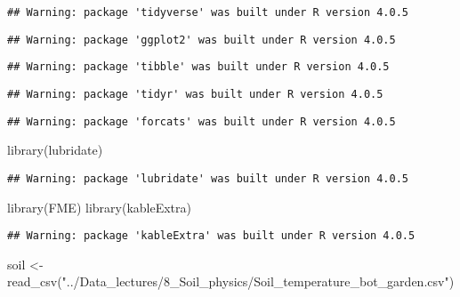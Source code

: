 \documentclass[
]{article}
\newenvironment{Shaded}{\begin{snugshade}}{\end{snugshade}}
\newcommand{\FunctionTok}[1]{\textcolor[rgb]{0.00,0.00,0.00}{#1}}
\newcommand{\NormalTok}[1]{#1}
\newcommand{\OtherTok}[1]{\textcolor[rgb]{0.56,0.35,0.01}{#1}}
\newcommand{\StringTok}[1]{\textcolor[rgb]{0.31,0.60,0.02}{#1}}
\begin{document}
\begin{verbatim}
## Warning: package 'tidyverse' was built under R version 4.0.5
\end{verbatim}

\begin{verbatim}
## Warning: package 'ggplot2' was built under R version 4.0.5
\end{verbatim}

\begin{verbatim}
## Warning: package 'tibble' was built under R version 4.0.5
\end{verbatim}

\begin{verbatim}
## Warning: package 'tidyr' was built under R version 4.0.5
\end{verbatim}

\begin{verbatim}
## Warning: package 'forcats' was built under R version 4.0.5
\end{verbatim}

\begin{Shaded}
\begin{Highlighting}[]
\FunctionTok{library}\NormalTok{(lubridate)}
\end{Highlighting}
\end{Shaded}

\begin{verbatim}
## Warning: package 'lubridate' was built under R version 4.0.5
\end{verbatim}

\begin{Shaded}
\begin{Highlighting}[]
\FunctionTok{library}\NormalTok{(FME)}
\FunctionTok{library}\NormalTok{(kableExtra)}
\end{Highlighting}
\end{Shaded}

\begin{verbatim}
## Warning: package 'kableExtra' was built under R version 4.0.5
\end{verbatim}

\begin{Shaded}
\begin{Highlighting}[]
\NormalTok{soil }\OtherTok{\textless{}{-}} \FunctionTok{read\_csv}\NormalTok{(}\StringTok{"../Data\_lectures/8\_Soil\_physics/Soil\_temperature\_bot\_garden.csv"}\NormalTok{)}
\end{Highlighting}
\end{Shaded}
\end{document}

